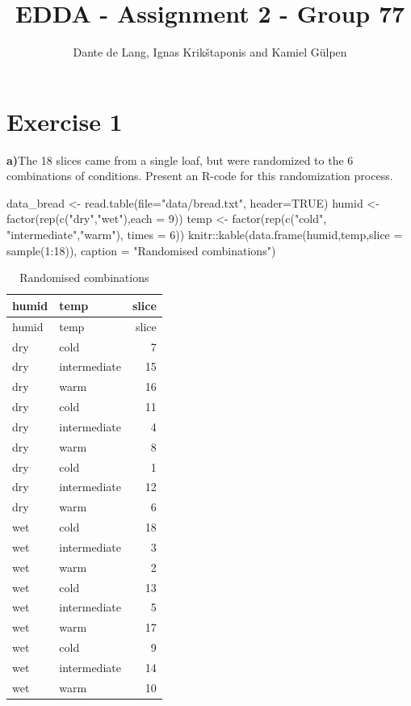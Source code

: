 \documentclass[
  10pt,
]{article}
\title{EDDA - Assignment 2 - Group 77}
\subtitle{Dante de Lang, Ignas Krikštaponis and Kamiel Gülpen}
\author{}
\date{\vspace{-2.5em}}
\newenvironment{Shaded}{\begin{snugshade}}{\end{snugshade}}
\newcommand{\AttributeTok}[1]{\textcolor[rgb]{0.77,0.63,0.00}{#1}}
\newcommand{\ConstantTok}[1]{\textcolor[rgb]{0.00,0.00,0.00}{#1}}
\newcommand{\DecValTok}[1]{\textcolor[rgb]{0.00,0.00,0.81}{#1}}
\newcommand{\FunctionTok}[1]{\textcolor[rgb]{0.00,0.00,0.00}{#1}}
\newcommand{\NormalTok}[1]{#1}
\newcommand{\OtherTok}[1]{\textcolor[rgb]{0.56,0.35,0.01}{#1}}
\newcommand{\SpecialCharTok}[1]{\textcolor[rgb]{0.00,0.00,0.00}{#1}}
\newcommand{\StringTok}[1]{\textcolor[rgb]{0.31,0.60,0.02}{#1}}
\begin{document}
\maketitle

\hypertarget{exercise-1}{%
\section{Exercise 1}\label{exercise-1}}

\textbf{a)}The 18 slices came from a single loaf, but were randomized to
the 6 combinations of conditions. Present an R-code for this
randomization process.

\begin{Shaded}
\begin{Highlighting}[]
\NormalTok{data\_bread }\OtherTok{\textless{}{-}} \FunctionTok{read.table}\NormalTok{(}\AttributeTok{file=}\StringTok{"data/bread.txt"}\NormalTok{, }\AttributeTok{header=}\ConstantTok{TRUE}\NormalTok{)}
\NormalTok{humid }\OtherTok{\textless{}{-}} \FunctionTok{factor}\NormalTok{(}\FunctionTok{rep}\NormalTok{(}\FunctionTok{c}\NormalTok{(}\StringTok{"dry"}\NormalTok{,}\StringTok{"wet"}\NormalTok{),}\AttributeTok{each =} \DecValTok{9}\NormalTok{))}
\NormalTok{temp }\OtherTok{\textless{}{-}} \FunctionTok{factor}\NormalTok{(}\FunctionTok{rep}\NormalTok{(}\FunctionTok{c}\NormalTok{(}\StringTok{"cold"}\NormalTok{, }\StringTok{"intermediate"}\NormalTok{,}\StringTok{"warm"}\NormalTok{), }\AttributeTok{times =} \DecValTok{6}\NormalTok{))}
\NormalTok{knitr}\SpecialCharTok{::}\FunctionTok{kable}\NormalTok{(}\FunctionTok{data.frame}\NormalTok{(humid,temp,}\AttributeTok{slice =} \FunctionTok{sample}\NormalTok{(}\DecValTok{1}\SpecialCharTok{:}\DecValTok{18}\NormalTok{)), }
             \AttributeTok{caption =} \StringTok{"Randomised combinations"}\NormalTok{)}
\end{Highlighting}
\end{Shaded}

\begin{longtable}[]{@{}llr@{}}
\caption{Randomised combinations}\tabularnewline
\toprule
humid & temp & slice\tabularnewline
\midrule
\endfirsthead
\toprule
humid & temp & slice\tabularnewline
\midrule
\endhead
dry & cold & 7\tabularnewline
dry & intermediate & 15\tabularnewline
dry & warm & 16\tabularnewline
dry & cold & 11\tabularnewline
dry & intermediate & 4\tabularnewline
dry & warm & 8\tabularnewline
dry & cold & 1\tabularnewline
dry & intermediate & 12\tabularnewline
dry & warm & 6\tabularnewline
wet & cold & 18\tabularnewline
wet & intermediate & 3\tabularnewline
wet & warm & 2\tabularnewline
wet & cold & 13\tabularnewline
wet & intermediate & 5\tabularnewline
wet & warm & 17\tabularnewline
wet & cold & 9\tabularnewline
wet & intermediate & 14\tabularnewline
wet & warm & 10\tabularnewline
\bottomrule
\end{longtable}
\end{document}
